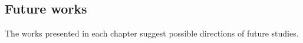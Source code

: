 
\subsection*{Future works}

The works presented in each chapter suggest possible directions of future studies.











